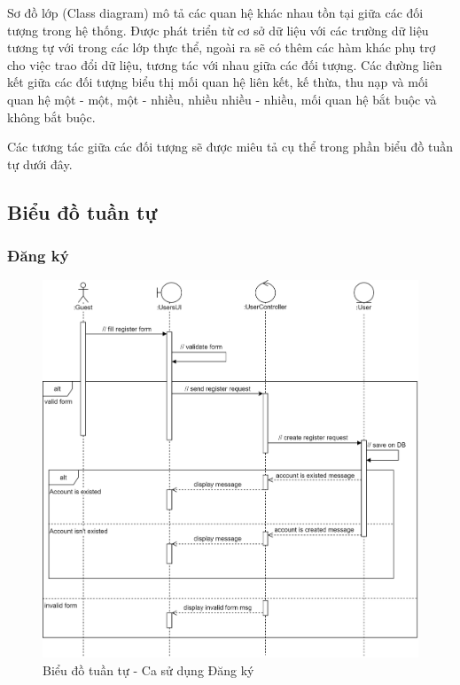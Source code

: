 \documentclass[./../main.tex]{subfiles}
\begin{document}
Sơ đồ lớp (Class diagram) mô tả các quan hệ khác nhau tồn tại giữa các đối tượng trong hệ thống. Được phát triển từ cơ sở dữ liệu với các trường dữ liệu tương tự với trong các lớp thực thể, ngoài ra sẽ có thêm các hàm khác phụ trợ cho việc trao đổi dữ liệu, tương tác với nhau giữa các đối tượng. Các đường liên kết giữa các đối tượng biểu thị mối quan hệ liên kết, kế thừa, thu nạp và mối quan hệ một - một, một - nhiều, nhiều nhiều - nhiều, mối quan hệ bắt buộc và không bắt buộc.

Các tương tác giữa các đối tượng sẽ được miêu tả cụ thể trong phần biểu đồ tuần tự dưới đây.

\subsection{Biểu đồ tuần tự}

\subsubsection{Đăng ký}
\begin{figure}[H]
	\centering
	\includegraphics[width=\linewidth]{./img/uc1.png}
	\caption{Biểu đồ tuần tự - Ca sử dụng Đăng ký}
\end{figure}
\end{document}
